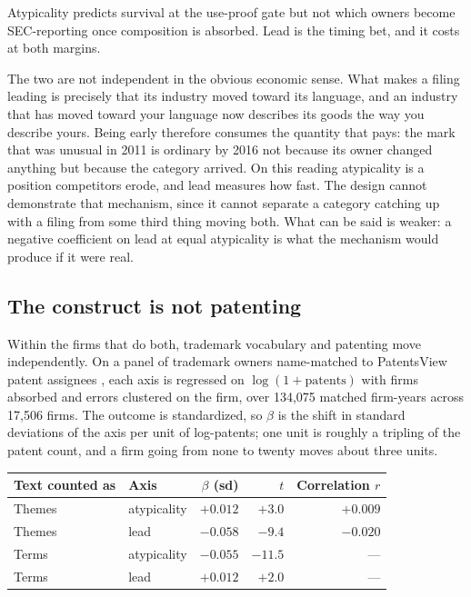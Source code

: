 Atypicality predicts survival at the use-proof gate but not which owners become SEC-reporting once composition is
absorbed. Lead is the timing bet, and it costs at both margins.

The two are not independent in the obvious economic sense. What makes a
filing leading is precisely that its industry moved toward its language, and
an industry that has moved toward your language now describes its goods the
way you describe yours. Being early therefore consumes the quantity that
pays: the mark that was unusual in 2011 is ordinary by 2016 not because its
owner changed anything but because the category arrived. On this reading
atypicality is a position competitors erode, and lead measures how fast.
The design cannot demonstrate that mechanism, since it cannot separate a
category catching up with a filing from some third thing moving both. What can
be said is weaker: a negative coefficient on lead at equal atypicality is what
the mechanism would produce if it were real.

\subsection{The construct is not patenting}\label{sec:patent}

Within the firms that do both, trademark vocabulary and patenting move
independently. On a panel of trademark owners name-matched to PatentsView
patent assignees \citep{PatentsView}, each axis is regressed on
$\log(1 + \mathrm{patents})$ with firms absorbed and errors clustered on the
firm, over 134{,}075 matched firm-years across 17{,}506 firms. The outcome is
standardized, so $\beta$ is the shift in standard deviations of the axis per
unit of log-patents; one unit is roughly a tripling of the patent count, and a
firm going from none to twenty moves about three units.

\begin{center}\small
\begin{tabular}{llrrr}
\toprule
Text counted as & Axis & $\beta$ (sd) & $t$ & Correlation $r$ \\
\midrule
Themes & atypicality & $+0.012$ & $+3.0$ & $+0.009$ \\
Themes & lead        & $-0.058$ & $-9.4$ & $-0.020$ \\
Terms  & atypicality & $-0.055$ & $-11.5$ & --- \\
Terms  & lead        & $+0.012$ & $+2.0$ & --- \\
\bottomrule
\end{tabular}
\end{center}

